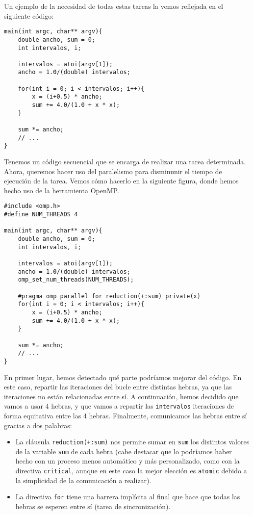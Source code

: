 Un ejemplo de la necesidad de todas estas tareas la vemos reflejada en el siguiente código:
    \begin{verbatim}
main(int argc, char** argv){
    double ancho, sum = 0;
    int intervalos, i;
    
    intervalos = atoi(argv[1]);
    ancho = 1.0/(double) intervalos;

    for(int i = 0; i < intervalos; i++){
        x = (i+0.5) * ancho;
        sum += 4.0/(1.0 + x * x);
    }

    sum *= ancho;
    // ...
}
    \end{verbatim}
\label{codigo_pi}
Tenemos un código secuencial que se encarga de realizar una tarea determinada. Ahora, queremos hacer uso del paralelismo para disminunir el tiempo de ejecución de la tarea. Vemos cómo hacerlo en la siguiente figura, donde hemos hecho uso de la herramienta OpenMP.
    \begin{verbatim}
#include <omp.h>
#define NUM_THREADS 4

main(int argc, char** argv){
    double ancho, sum = 0;
    int intervalos, i;
    
    intervalos = atoi(argv[1]);
    ancho = 1.0/(double) intervalos;
    omp_set_num_threads(NUM_THREADS);

    #pragma omp parallel for reduction(+:sum) private(x)
    for(int i = 0; i < intervalos; i++){
        x = (i+0.5) * ancho;
        sum += 4.0/(1.0 + x * x);
    }

    sum *= ancho;
    // ...
}
    \end{verbatim}
En primer lugar, hemos detectado qué parte podríamos mejorar del código. En este caso, repartir las iteraciones del bucle entre distintas hebras, ya que las iteraciones no están relacionadas entre sí. A continuación, hemos decidido que vamos a usar 4 hebras, y que vamos a repartir las \verb|intervalos| iteraciones de forma equitativa entre las 4 hebras. Finalmente, comunicamos las hebras entre sí gracias a dos palabras:
\begin{itemize}
    \item La cláusula \verb|reduction(+:sum)| nos permite sumar en \verb|sum| los distintos valores de la variable \verb|sum| de cada hebra (cabe destacar que lo podríamos haber hecho con un proceso menos automático y más personalizado, como con la directiva \verb|critical|, aunque en este caso la mejor elección es \verb|atomic| debido a la simplicidad de la comunicación a realizar).
    \item La directiva \verb|for| tiene una barrera implícita al final que hace que todas las hebras se esperen entre sí (tarea de sincronización).
\end{itemize}

